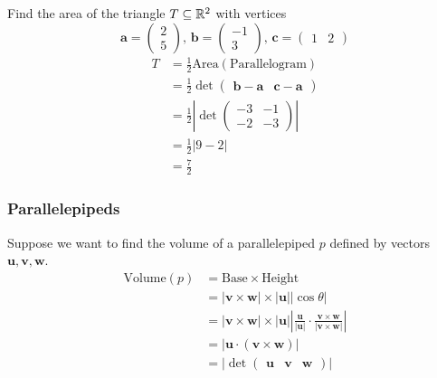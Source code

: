 \documentclass[10pt, a4paper]{article}
\newcommand{\mbf}[1]{\mathbf{#1}}
\begin{document}
\begin{example}
    Find the area of the triangle $T \subseteq \mathbb{R} ^ 2$ with vertices
    \[
    \mbf{a} = \begin{pmatrix}
        2 \\ 5
    \end{pmatrix},\,\mbf{b} = \begin{pmatrix}
        -1 \\ 3
    \end{pmatrix},\,\mbf{c} = \begin{pmatrix}
        1 & 2
    \end{pmatrix}
    \]
    \begin{align*}
        T &= \frac{1}{2}\mathrm{Area}(\text{Parallelogram}) \\
        &= \frac{1}{2}\det\begin{pmatrix} \mbf{b} - \mbf{a} & \mbf{c} - \mbf{a}
        \end{pmatrix} \\
        &= \frac{1}{2}\left|\det\begin{pmatrix}
            -3 & -1 \\ -2 & -3
        \end{pmatrix}\right| \\
    &= \frac{1}{2}|9 - 2| \\
    &= \frac{7}{2}
    \end{align*}
\end{example}

\subsubsection{Parallelepipeds}
Suppose we want to find the volume of a parallelepiped $p$ defined by vectors $\mbf{u, v, w}$.
\begin{align*}
    \mathrm{Volume}(p) &= \mathrm{Base} \times \mathrm{Height} \\
    &= |\mbf{v \times w}| \times |\mbf{u}||\cos\theta| \\
    &= |\mbf{v \times w}| \times |\mbf{u}|\left|\frac{\mbf{u}}{|\mbf{u}|} \cdot \frac{\mbf{v} \times \mbf{w}}{|\mbf{v}\times \mbf{w}|}\right| \\
    &= |\mbf{u} \cdot (\mbf{v} \times \mbf{w})| \\
    &= \left|\det\begin{pmatrix}
        \mbf{u} & \mbf{v} & \mbf{w}
    \end{pmatrix}\right|
\end{align*} 
\end{document}

